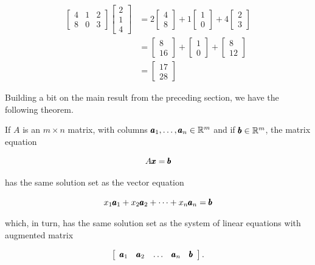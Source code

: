 \begin{example}
    \[
\begin{aligned}
{\left[\begin{array}{lll}
4 & 1 & 2 \\
8 & 0 & 3
\end{array}\right]\left[\begin{array}{l}
2 \\
1 \\
4
\end{array}\right] } & =2\left[\begin{array}{l}
4 \\
8
\end{array}\right]+1\left[\begin{array}{l}
1 \\
0
\end{array}\right]+4\left[\begin{array}{l}
2 \\
3
\end{array}\right] \\
& =\left[\begin{array}{c}
8 \\
16
\end{array}\right]+\left[\begin{array}{l}
1 \\
0
\end{array}\right]+\left[\begin{array}{c}
8 \\
12
\end{array}\right] \\
& =\left[\begin{array}{l}
17 \\
28
\end{array}\right]
\end{aligned}
\]
\end{example}

Building a bit on the main result from the preceding section, we have the following theorem.

\begin{theorem}
    If $A$ is an $m \times n$ matrix, with columns $\pmb{a}_1, \ldots, \pmb{a}_n \in \mathbb{R}^m$ and if $\pmb{b} \in \mathbb{R}^m$, the matrix equation

\[
A \pmb{x} = \pmb{b}
\]

has the same solution set as the vector equation

\[
x_1 \pmb{a}_1 + x_2 \pmb{a}_2 + \cdots + x_n \pmb{a}_n = \pmb{b}
\]

which, in turn, has the same solution set as the system of linear equations with augmented matrix

\[
\left[\begin{array}{lllll}
\pmb{a}_1 & \pmb{a}_2 & \ldots & \pmb{a}_n & \pmb{b}
\end{array}\right].
\]

\end{theorem}

